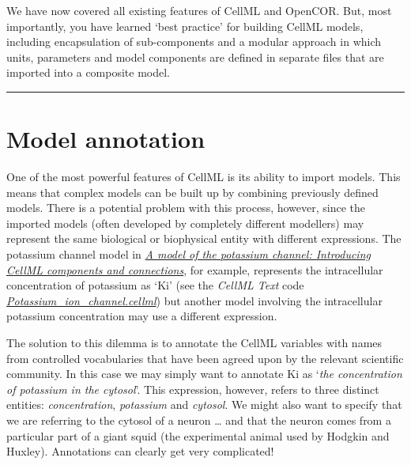 \documentclass[a4paper,10pt,english]{sphinxmanual}
\begin{document}
We have now covered all existing features of CellML and OpenCOR. But,
most importantly, you have learned `best practice' for building CellML
models, including encapsulation of sub-components and a modular approach
in which units, parameters and model components are defined in separate
files that are imported into a composite model.


\bigskip\hrule{}\bigskip



\chapter{Model annotation}
\label{annotation::doc}\label{annotation:model-annotation}
One of the most powerful features of CellML is its ability to import
models. This means that complex models can be built up by combining
previously defined models. There is a potential problem with this
process, however, since the imported models (often developed by
completely different modellers) may represent the same biological or
biophysical entity with different expressions. The potassium channel
model in {\hyperref[cellml_comp_and_conn:ocr\string-tut\string-intro\string-cellml\string-comp\string-conn]{\emph{A model of the potassium channel: Introducing CellML components and connections}}}, for example, represents the intracellular
concentration of potassium as ‘Ki’ (see the \emph{CellML Text} code {\hyperref[cellml_comp_and_conn:ocr\string-tut\string-k\string-ion\string-ch\string-ctc]{\emph{Potassium\_ion\_channel.cellml}}}) but another model involving the intracellular potassium
concentration may use a different expression.

The solution to this dilemma is to annotate the CellML variables with
names from controlled vocabularies that have been agreed upon by the
relevant scientific community. In this case we may simply want to
annotate Ki as ‘\emph{the concentration of potassium in the cytosol}’.
This expression, however, refers to three distinct entities:
\emph{concentration}, \emph{potassium} and \emph{cytosol}. We might also want to
specify that we are referring to the cytosol of a neuron … and that the
neuron comes from a particular part of a giant squid (the experimental
animal used by Hodgkin and Huxley). Annotations can clearly get very
complicated!
\end{document}

